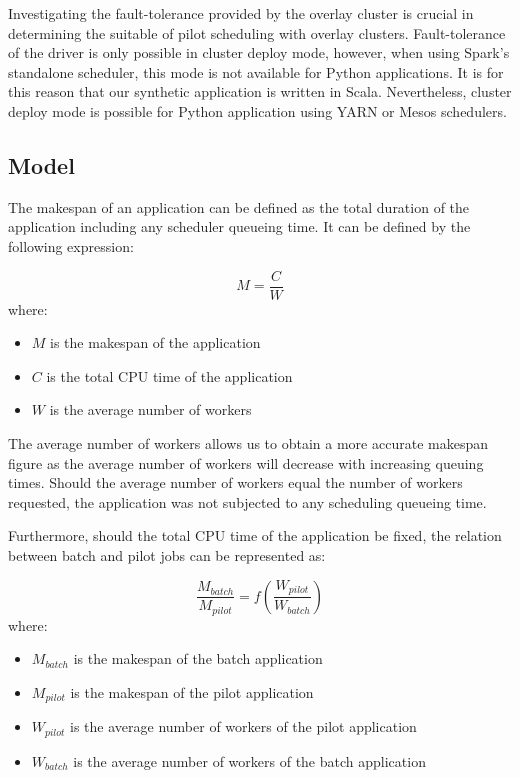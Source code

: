 \documentclass{IEEEtran}
\newcommand{\todo}[1]{\marginpar{\parbox{18mm}{\flushleft\tiny\color{red}\textbf{TODO}:
      #1}}}
\begin{document}
    Investigating the fault-tolerance provided by the overlay cluster is
    crucial in determining the suitable of pilot scheduling with overlay clusters.
    Fault-tolerance of the driver is only possible in cluster deploy mode, however,
    when using Spark's standalone scheduler, this mode is not available for Python 
    applications. It is for this reason that our synthetic application is written
    in Scala. Nevertheless, cluster deploy mode is possible for Python application
    using YARN or Mesos schedulers.

    
   
    \todo{walltime parameter of workflow}
    \subsection{Model}

    The makespan of an application can be defined as the total duration of the 
    application including any scheduler queueing time. It can be defined by
    the following expression:

    \begin{equation}
        M = \frac{C}{W} \label{eq:mcw}
    \end{equation}
    where:
    \begin{itemize}
        \item $M$ is the makespan of the application
        \item $C$ is the total CPU time of the application
        \item $W$ is the average number of workers
    \end{itemize}
    
    The average number of workers allows us to obtain a more accurate makespan
    figure as the average number of workers will decrease with increasing 
    queuing times. Should the average number of workers equal the number of workers
    requested, the application was not subjected to any scheduling queueing time. 

    Furthermore, should the total CPU time of the application be fixed, the relation
    between batch and pilot jobs can be represented as:

    \begin{equation}
        \frac{M_{batch}}{M_{pilot}} = f(\frac{W_{pilot}}{W_{batch}})\label{eq:makespancomp}
    \end{equation}
    where:
    \begin{itemize}
        \item $M_{batch}$ is the makespan of the batch application
        \item $M_{pilot}$ is the makespan of the pilot application
        \item $W_{pilot}$ is the average number of workers of the pilot application
        \item $W_{batch}$ is the average number of workers of the batch application
    \end{itemize}
\end{document}
